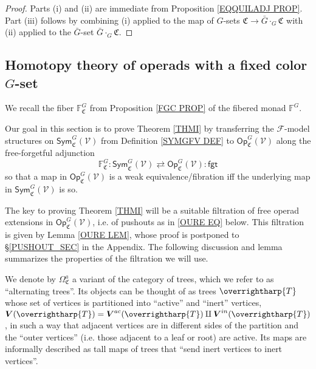 \documentclass[a4paper,10pt
,draft
]{article}%
\numberwithin{equation}{section}
\numberwithin{figure}{section}
\theoremstyle{definition} %
\newcommand{\vect}[1]{\text{\overrightharp{\ensuremath{#1}}}}
\newcommand{\F}{\ensuremath{\mathcal F}}
\newcommand{\V}{\ensuremath{\mathcal V}}
\newcommand{\1}{\ensuremath{\mathbbm 1}}%
\begin{document}
\begin{proof}
	Parts (i) and (ii) are immediate from Proposition \ref{EQQUILADJ PROP}.
%	
	Part (iii) follows by combining (i) applied to 
	the map of $G$-sets $\mathfrak{C} \to \bar{G} \cdot_G \mathfrak{C}$
	with (ii) applied to the $\bar{G}$-set $\bar{G} \cdot_G \mathfrak{C}$.
\end{proof}




 
\subsection{Homotopy theory of operads with a fixed color $G$-set}
\label{OPC_MS_SEC}


We recall the fiber $\mathbb{F}^G_{\mathfrak{C}}$ from Proposition \ref{FGC PROP}
of the fibered monad $\mathbb{F}^G$.

Our goal in this section is to prove 
Theorem \ref{THMI} by transferring the $\F$-model structures on
$\mathsf{Sym}^G_{\mathfrak{C}}(\V)$
from Definition \ref{SYMGFV DEF}
to $\mathsf{Op}^G_{\mathfrak{C}}(\V)$
along the free-forgetful adjunction
\begin{equation}\label{OPAUTADJ EQ}
\mathbb{F}^G_{\mathfrak{C}} \colon
\mathsf{Sym}^G_{\mathfrak{C}}(\V)
\rightleftarrows
\mathsf{Op}^G_{\mathfrak{C}}(\V)
\colon \mathsf{fgt}
\end{equation}
so that a map in $\mathsf{Op}^G_{\mathfrak{C}}(\V)$
is a weak equivalence/fibration iff the underlying map in 
$\mathsf{Sym}^G_{\mathfrak{C}}(\V)$ is so.
%


The key to proving Theorem \ref{THMI} will be a suitable filtration of free operad extensions in $\mathsf{Op}_{\mathfrak{C}}^G(\V)$,
i.e. of pushouts as in \eqref{OURE EQ} below.
This filtration is given by Lemma \ref{OURE LEM},
whose proof is postponed to \S \ref{PUSHOUT_SEC} in the Appendix.
The following discussion and lemma summarizes the properties of the filtration we will use.

We denote by $\Omega^a_{\mathfrak{C}}$
a variant of the category of trees, 
which we refer to as ``alternating trees''.
Its objects can be thought of as trees $\vect{T}$ 
whose set of vertices is partitioned into ``active'' and ``inert'' vertices,
$\boldsymbol{V}(\vect T) = 
\boldsymbol{V}^{ac}(\vect T) \amalg \boldsymbol{V}^{in}(\vect T)$,
in such a way that adjacent vertices are in different sides of the partition and the ``outer vertices'' (i.e. those adjacent to a leaf or root) are active.
Its maps are informally described as tall maps of trees that 
``send inert vertices to inert vertices''.
\end{document}
